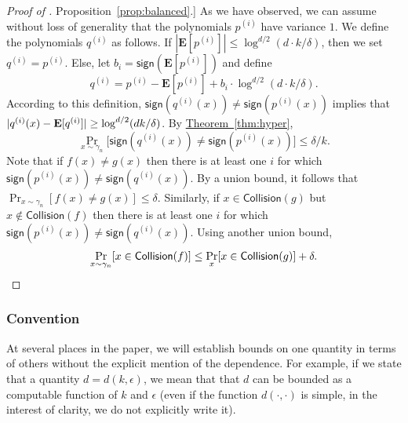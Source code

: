 \documentclass[11pt]{article}
\numberwithin{equation}{section}
\theoremstyle{definition}
\theoremstyle{plain}
\newcommand{\expref}[2]{\hyperref[#2]{#1~\ref{#2}}}
\newcommand{\E}{{\bf E}}
\begin{document}
\begin{proof}[Proof of \expref{Proposition}{prop:balanced}.]
As we have observed, we can assume without loss of generality that the polynomials $p^{(i)}$ have variance $1$. We define the polynomials $q^{(i)}$ as follows. If $|\mathbf{E}[p^{(i)}] | \leq \log^{d/2}(d \cdot k / \delta)$, then we set $q^{(i)} = p^{(i)}$. Else, let $b_i  = \mathsf{sign} (\mathbf{E}[p^{(i)}])$ and define 
\[
q^{(i)} = p^{(i)}  -\mathbf{E}[p^{(i)}]  + b_i \cdot \log^{d/2}(d \cdot k / \delta). 
\]
%
%
According to this definition, $\mathsf{sign}(q^{(i)}(x)) \ne \mathsf{sign}(p^{(i)}(x))$ implies
that $|q^{(i)}(x) - \E[q^{(i)}]| \ge \log^{d/2} (d k/\delta)$.
By \expref{Theorem}{thm:hyper},
\[
\Pr_{x \sim \gamma_n} \big[ \mathsf{sign}(q^{(i)}(x)) \neq  \mathsf{sign}(p^{(i)}(x)) \big] \le \delta/k. 
\]
Note that if $f(x) \ne g(x)$ then there is at least one $i$ for which $\mathsf{sign}(p^{(i)}(x)) \ne \mathsf{sign}(q^{(i)}(x))$.
By a union bound, it follows that $\Pr_{x \sim \gamma_n}[f(x) \ne g(x)] \le \delta$. Similarly, if $x \in \mathsf{Collision}(g)$ but
$x \not \in \mathsf{Collision}(f)$ then there is at least one $i$ for which $\mathsf{sign}(p^{(i)}(x)) \ne \mathsf{sign}(q^{(i)}(x))$.
Using another union bound,
\[
  \Pr_{x \sim \gamma_n} [ x \in \mathsf{Collision}(f) ] \le \Pr_{x}[x \in \mathsf{Collision}(g)] + \delta. \qedhere
  \]
\end{proof}

\subsubsection*{Convention} 
%
At  several places in the paper, we will establish bounds on one quantity in terms of others without the explicit mention of the dependence. For example, if we state that a quantity $d= d(k,\epsilon)$, we mean that that $d$ can be bounded as a computable function of $k$ and $\epsilon$ (even if the function $d(\cdot, \cdot)$ is simple, in the interest of clarity, we do not explicitly write it).  

%
\end{document}
